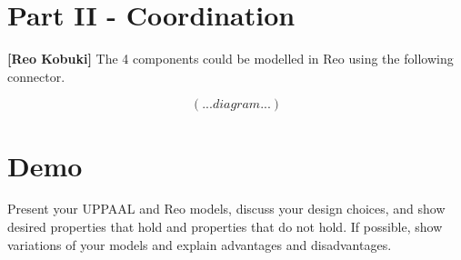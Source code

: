 \documentclass[11pt]{article}
\begin{document}
\section*{Part II - Coordination}

\begin{exercise} \label{ex:vm2}
\textbf{[Reo Kobuki]}
The 4 components could be modelled in Reo using the following connector.

\[ (... diagram ...) \]


\end{exercise}



\section*{Demo}

\begin{exercise}  
Present your UPPAAL and Reo models, discuss your design choices, and show desired properties that hold and properties that do not hold.
If possible, show variations of your models and explain advantages and disadvantages.
\end{exercise}


 
\end{document}
